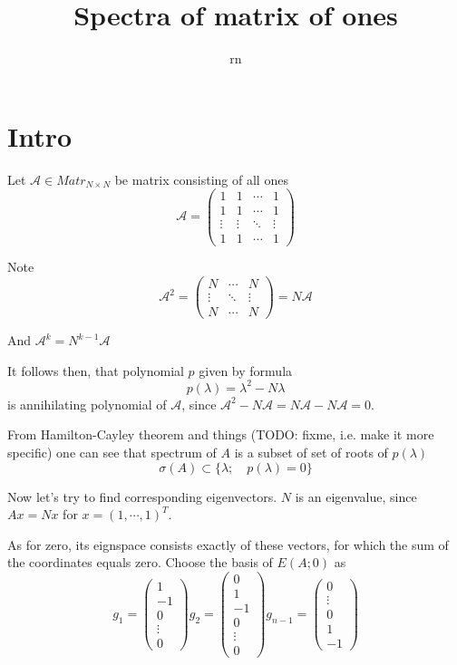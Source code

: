 \documentclass{article}
\title{Spectra of matrix of ones}
\author{rn}
\providecommand{\Matr}{\mathit{Matr}}
\begin{document}
\maketitle
\tableofcontents
\newpage

\section{Intro}
Let $\mathcal A \in \Matr_{N\times N}$ be matrix consisting of all ones
$$\mathcal A =
\begin{pmatrix}
    1      & 1      & \cdots & 1 \\
    1      & 1      & \cdots & 1 \\
    \vdots & \vdots & \ddots & \vdots \\
    1      & 1      & \cdots & 1
\end{pmatrix}$$

Note
$$\mathcal A^2 =
\begin{pmatrix}
    N      & \cdots & N \\
    \vdots & \ddots & \vdots \\
    N      & \cdots & N
\end{pmatrix} = N \mathcal A$$

And
$\mathcal A^k = N^{k-1} \mathcal A$

It follows then, that polynomial $p$ given by formula
$$p(\lambda) = \lambda^2 - N \lambda$$
is annihilating polynomial of $\mathcal A$,
since $\mathcal A^2 - N\mathcal A = N\mathcal A - N\mathcal A = 0$.

From Hamilton-Cayley theorem and things (TODO: fixme, i.e. make it more specific)
one can see that spectrum of $A$
is a subset of set of roots of $p(\lambda)$
$$\sigma(A) \subset \{ \lambda; \quad p(\lambda) = 0 \}$$

Now let's try to find corresponding eigenvectors.
$N$ is an eigenvalue, since $A x = N x$ for $x = \left(1, \cdots, 1\right)^T$.

As for zero, its eignspace consists exactly of these vectors,
for which the sum of the coordinates equals zero.
Choose the basis of $E(A; 0)$ as
$$
g_1 = \begin{pmatrix}1 \\ -1 \\ 0 \\ \vdots \\ 0\end{pmatrix}
g_2 = \begin{pmatrix}0 \\ 1 \\ -1 \\ 0 \\ \vdots \\ 0\end{pmatrix}
g_{n-1} = \begin{pmatrix}0 \\ \vdots \\ 0 \\ 1 \\ -1 \end{pmatrix}$$
\end{document}
